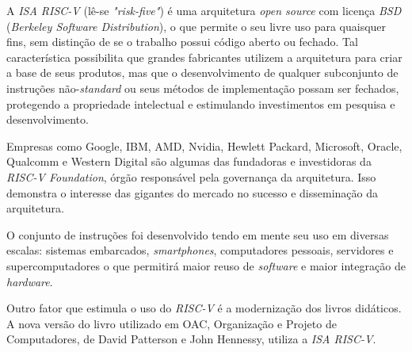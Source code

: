     {A \textit{ISA RISC-V} (lê-se \textit{"risk-five"}) é uma arquitetura \textit{open source} com licença \textit{BSD} (\textit{Berkeley Software Distribution}), o que permite o seu livre uso para quaisquer fins, sem distinção de se o trabalho possui código aberto ou fechado. Tal característica possibilita que grandes fabricantes utilizem a arquitetura para criar a base de seus produtos, mas que o desenvolvimento de qualquer subconjunto de instruções não-\textit{standard} ou seus métodos de implementação possam ser fechados, protegendo a propriedade intelectual e estimulando investimentos em pesquisa e desenvolvimento.}

    {Empresas como Google, IBM, AMD, Nvidia, Hewlett Packard, Microsoft, Oracle, Qualcomm e Western Digital são algumas das fundadoras e investidoras da \textit{RISC-V Foundation}, órgão responsável pela governança da arquitetura. Isso demonstra o interesse das gigantes do mercado no sucesso e disseminação da arquitetura.}

    {O conjunto de instruções foi desenvolvido tendo em mente seu uso em diversas escalas: sistemas embarcados, \textit{smartphones}, computadores pessoais, servidores e supercomputadores o que permitirá maior reuso de \textit{software} e maior integração de \textit{hardware}.}

    {Outro fator que estimula o uso do \textit{RISC-V} é a modernização dos livros didáticos. A nova versão do livro utilizado em OAC, Organização e Projeto de Computadores, de David Patterson e John Hennessy, utiliza a \textit{ISA RISC-V}.}
